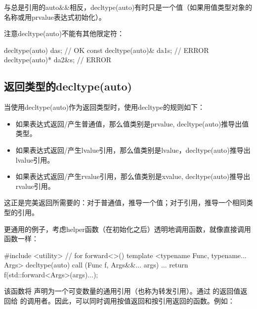 与总是引用的auto\&\&相反，decltype(auto)有时只是一个值（如果用值类型对象的名称或用prvalue表达式初始化）。

注意decltype(auto)不能有其他限定符：

\begin{cppcode}
decltype(auto) da{s}; // OK
const decltype(auto)& da1{s}; // ERROR
decltype(auto)* da2{&s}; // ERROR
\end{cppcode}

\subsection{返回类型的decltype(auto)}

当使用decltype(auto)作为返回类型时，使用decltype的规则如下：

\begin{itemize}
	\item 如果表达式返回/产生普通值，那么值类别是prvalue, decltype(auto)推导出值类型。
	\item 如果表达式返回/产生lvalue引用，那么值类别是lvalue，decltype(auto)推导出lvalue引用。
	\item 如果表达式返回/产生rvalue引用，那么值类别是xvalue, decltype(auto)推导出rvalue引用。
\end{itemize}

这正是完美返回所需要的：对于普通值，推导一个值；对于引用，推导一个相同类型的引用。

更通用的例子，考虑helper函数（在初始化之后）透明地调用函数，就像直接调用函数一样：

\begin{cppcode}
#include <utility> // for forward<>()
template <typename Func, typename... Args>
decltype(auto) call (Func f, Args&&... args)
{
	...
	return f(std::forward<Args>(args)...);
}
\end{cppcode}

该函数将  声明为一个可变数量的通用引用（也称为转发引用）。通过  的返回值返回给  的调用者。因此，可以同时调用按值返回和按引用返回的函数。例如：

